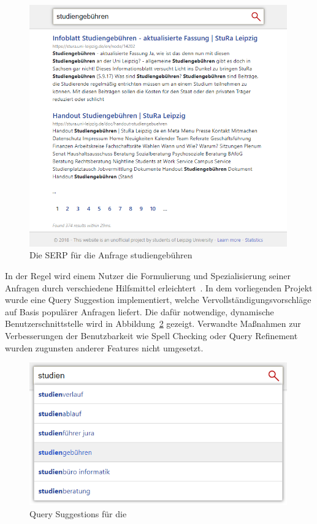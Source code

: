 \begin{figure}[!ht]
	\includegraphics[width=0.99\textwidth]{chapter_query_processing/serp.png}
	\caption{Die SERP für die Anfrage \glqq studiengebühren\grqq}
	\label{fig:serp}
\end{figure}

In der Regel wird einem Nutzer die Formulierung und Spezialisierung seiner Anfragen durch verschiedene Hilfsmittel
erleichtert~\cite{}.
In dem vorliegenden Projekt wurde eine Query Suggestion implementiert,
welche Vervollständigungsvorschläge auf Basis populärer Anfragen liefert.
Die dafür notwendige, dynamische Benutzerschnittstelle wird in Abbildung~\ref{fig:query_suggestions} gezeigt.
Verwandte Maßnahmen zur Verbesserungen der Benutzbarkeit wie Spell Checking oder Query Refinement 
wurden zugunsten anderer Features nicht umgesetzt.

\begin{figure}[!ht]
	\includegraphics[width=0.99\textwidth]{chapter_query_processing/autocomplete.png}
	\caption{Query Suggestions für die }
	\label{fig:query_suggestions}
\end{figure}

